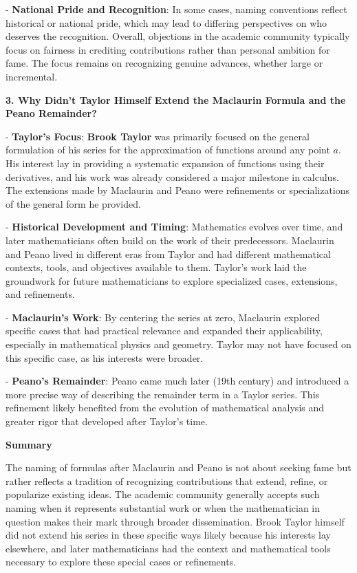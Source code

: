 \documentclass[a4paper,12pt]{book}
\begin{document}
- \textbf{National Pride and Recognition}: In some cases, naming conventions reflect historical or national pride, which may lead to differing perspectives on who deserves the recognition. 
Overall, objections in the academic community typically focus on fairness in crediting contributions rather than personal ambition for fame. The focus remains on recognizing genuine advances, whether large or incremental.

\textbf{3. Why Didn’t Taylor Himself Extend the Maclaurin Formula and the Peano Remainder?}

- \textbf{Taylor’s Focus}: \textbf{Brook Taylor} was primarily focused on the general formulation of his series for the approximation of functions around any point \( a \). His interest lay in providing a systematic expansion of functions using their derivatives, and his work was already considered a major milestone in calculus. The extensions made by Maclaurin and Peano were refinements or specializations of the general form he provided.

- \textbf{Historical Development and Timing}: Mathematics evolves over time, and later mathematicians often build on the work of their predecessors. Maclaurin and Peano lived in different eras from Taylor and had different mathematical contexts, tools, and objectives available to them. Taylor’s work laid the groundwork for future mathematicians to explore specialized cases, extensions, and refinements.

- \textbf{Maclaurin’s Work}: By centering the series at zero, Maclaurin explored specific cases that had practical relevance and expanded their applicability, especially in mathematical physics and geometry. Taylor may not have focused on this specific case, as his interests were broader.

- \textbf{Peano’s Remainder}: Peano came much later (19th century) and introduced a more precise way of describing the remainder term in a Taylor series. This refinement likely benefited from the evolution of mathematical analysis and greater rigor that developed after Taylor's time.

\textbf{Summary}

The naming of formulas after Maclaurin and Peano is not about seeking fame but rather reflects a tradition of recognizing contributions that extend, refine, or popularize existing ideas. The academic community generally accepts such naming when it represents substantial work or when the mathematician in question makes their mark through broader dissemination. Brook Taylor himself did not extend his series in these specific ways likely because his interests lay elsewhere, and later mathematicians had the context and mathematical tools necessary to explore these special cases or refinements.
\end{document}
